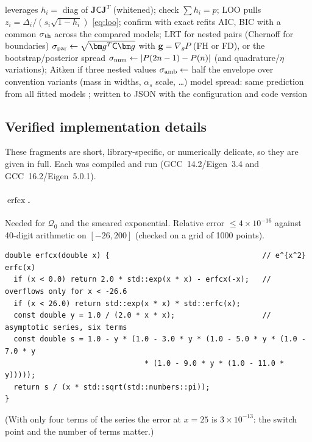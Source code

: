 \documentclass[11pt,a4paper]{article}
\numberwithin{equation}{section}
\theoremstyle{definition}
\theoremstyle{plain}
\theoremstyle{remark}
\numberwithin{algorithm}{section}
\newcommand{\as}{\alpha_s}
\newcommand{\erfcx}{\operatorname{erfcx}}
\newcommand{\sC}{\mathsf C}
\newcommand{\vg}{\bm g}
\begin{document}
\begin{algorithm}[H]
\caption{Validation and error budget of a prediction $P$}\label{alg:budget}
\begin{algorithmic}[1]
\State leverages $h_i=$ diag of $\mathbf J\sC\mathbf J^T$ (whitened); check $\sum h_i=p$; LOO pulls $z_i=\Delta_i/(s_i\sqrt{1-h_i})$ \eqref{eq:loo}; confirm with exact refits
\State AIC, BIC with a common $\sigma_{\rm th}$ across the compared models; LRT for nested pairs (Chernoff for boundaries)
\State $\sigma_{\rm par}\gets\sqrt{\vg^T\sC\vg}$ with $\vg=\nabla_\theta P$ (FH or FD), or the bootstrap/posterior spread
\State $\sigma_{\rm num}\gets|P(2n-1)-P(n)|$ (and quadrature/$\eta$ variations); Aitken if three nested values
\State $\sigma_{\rm amb}\gets$ half the envelope over convention variants (mass in widths, $\as$ scale, \dots)
\State model spread: same prediction from all fitted models
\Ensure {}; written to JSON with the configuration and code version
\end{algorithmic}
\end{algorithm}

\subsection{Verified implementation details}\label{sec:bp-verified}
These fragments are short, library-specific, or numerically delicate, so they are given in full. Each was compiled and run (GCC~14.2/Eigen~3.4 and GCC~16.2/Eigen~5.0.1).

\paragraph{$\erfcx$.} Needed for $\mathcal Q_0$ and the smeared exponential. Relative error $\le4\times10^{-16}$ against 40-digit arithmetic on $[-26,200]$ (checked on a grid of 1000 points).
\begin{lstlisting}[style=cpp]
double erfcx(double x) {                                   // e^{x^2} erfc(x)
  if (x < 0.0) return 2.0 * std::exp(x * x) - erfcx(-x);   // overflows only for x < -26.6
  if (x < 26.0) return std::exp(x * x) * std::erfc(x);
  const double y = 1.0 / (2.0 * x * x);                    // asymptotic series, six terms
  const double s = 1.0 - y * (1.0 - 3.0 * y * (1.0 - 5.0 * y * (1.0 - 7.0 * y
                                * (1.0 - 9.0 * y * (1.0 - 11.0 * y)))));
  return s / (x * std::sqrt(std::numbers::pi));
}
\end{lstlisting}
(With only four terms of the series the error at $x=25$ is $3\times10^{-13}$: the switch point and the number of terms matter.)
\end{document}
